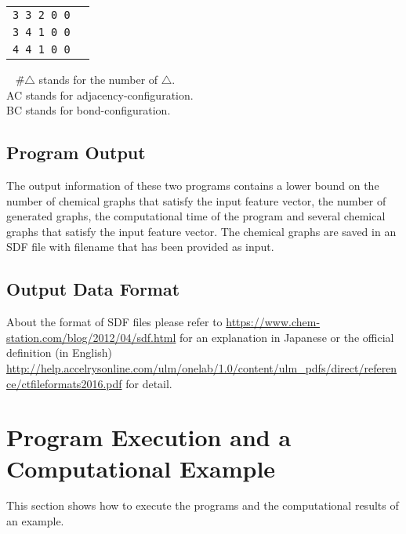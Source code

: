 \documentclass[11pt,titlepage,dvipdfmx,twoside]{article}
\begin{document}
\begin{table}[H]
\begin{center}
\begin{tabular}{l|l}
{\tt 3 3 2 0 0} & \\
{\tt 3 4 1 0 0} & \\
{\tt 4 4 1 0 0} & \\ \hline
  \end{tabular}
\vspace{-4mm}
\end{center}
\begin{tabbing}
~\hspace{15mm} \= \#$\triangle$ stands for the number of $\triangle$.\\
\> AC stands for adjacency-configuration.\\
\> BC stands for bond-configuration.
\end{tabbing}
\end{table}



\subsection{Program Output}
\label{sec:Output}

The output information of these two programs contains
a lower bound on the number of chemical graphs that satisfy the input feature vector,
the number of generated graphs,
the computational time of the program and
several chemical graphs that satisfy the input feature vector.
The chemical graphs are saved in an SDF file with filename that has been provided as input.


\subsection{Output Data Format}
\label{sec:OutputFormat}

About the format of SDF files please refer to 
\url{https://www.chem-station.com/blog/2012/04/sdf.html} for an
explanation in Japanese or 
the official definition (in English)
\url{http://help.accelrysonline.com/ulm/onelab/1.0/content/ulm_pdfs/direct/reference/ctfileformats2016.pdf}  for detail.



\bigskip



\section{Program Execution and a Computational Example}
\label{sec:Example}

This section shows how to execute the programs and the computational results of an example.
\end{document}
